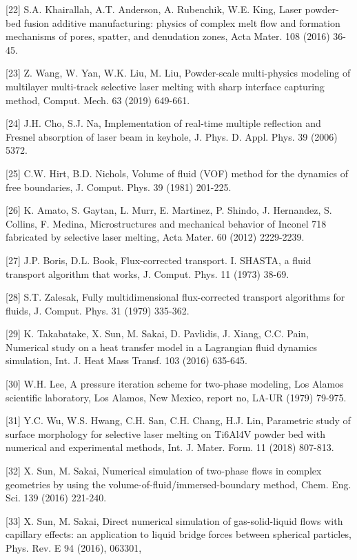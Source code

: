 \documentclass[10pt]{article}
\begin{document}
[22] S.A. Khairallah, A.T. Anderson, A. Rubenchik, W.E. King, Laser powder-bed fusion additive manufacturing: physics of complex melt flow and formation mechanisms of pores, spatter, and denudation zones, Acta Mater. 108 (2016) 36-45.

[23] Z. Wang, W. Yan, W.K. Liu, M. Liu, Powder-scale multi-physics modeling of multilayer multi-track selective laser melting with sharp interface capturing method, Comput. Mech. 63 (2019) 649-661.

[24] J.H. Cho, S.J. Na, Implementation of real-time multiple reflection and Fresnel absorption of laser beam in keyhole, J. Phys. D. Appl. Phys. 39 (2006) 5372.

[25] C.W. Hirt, B.D. Nichols, Volume of fluid (VOF) method for the dynamics of free boundaries, J. Comput. Phys. 39 (1981) 201-225.

[26] K. Amato, S. Gaytan, L. Murr, E. Martinez, P. Shindo, J. Hernandez, S. Collins, F. Medina, Microstructures and mechanical behavior of Inconel 718 fabricated by selective laser melting, Acta Mater. 60 (2012) 2229-2239.

[27] J.P. Boris, D.L. Book, Flux-corrected transport. I. SHASTA, a fluid transport algorithm that works, J. Comput. Phys. 11 (1973) 38-69.

[28] S.T. Zalesak, Fully multidimensional flux-corrected transport algorithms for fluids, J. Comput. Phys. 31 (1979) 335-362.

[29] K. Takabatake, X. Sun, M. Sakai, D. Pavlidis, J. Xiang, C.C. Pain, Numerical study on a heat transfer model in a Lagrangian fluid dynamics simulation, Int. J. Heat Mass Transf. 103 (2016) 635-645.

[30] W.H. Lee, A pressure iteration scheme for two-phase modeling, Los Alamos scientific laboratory, Los Alamos, New Mexico, report no, LA-UR (1979) 79-975.

[31] Y.C. Wu, W.S. Hwang, C.H. San, C.H. Chang, H.J. Lin, Parametric study of surface morphology for selective laser melting on Ti6Al4V powder bed with numerical and experimental methods, Int. J. Mater. Form. 11 (2018) 807-813.

[32] X. Sun, M. Sakai, Numerical simulation of two-phase flows in complex geometries by using the volume-of-fluid/immersed-boundary method, Chem. Eng. Sci. 139 (2016) 221-240.

[33] X. Sun, M. Sakai, Direct numerical simulation of gas-solid-liquid flows with capillary effects: an application to liquid bridge forces between spherical particles, Phys. Rev. E 94 (2016), 063301,
\end{document}
